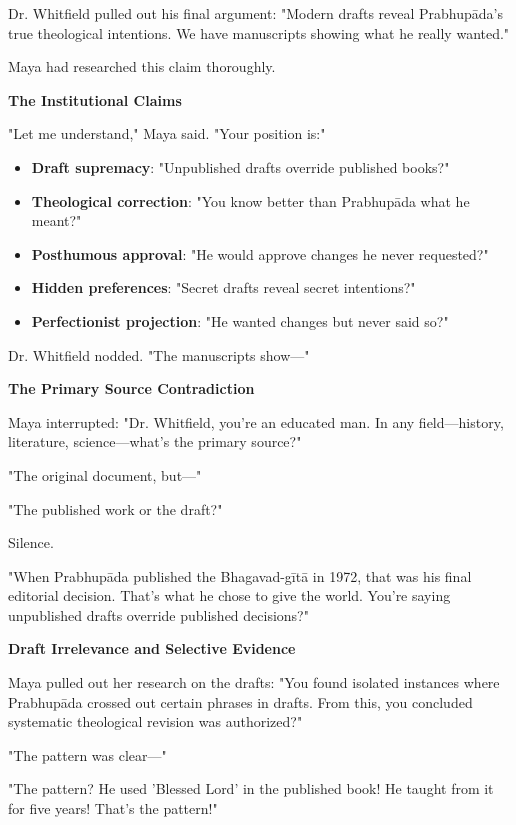\documentclass[11pt,twoside]{book}
\begin{document}
Dr. Whitfield pulled out his final argument: "Modern drafts reveal Prabhupāda's true theological intentions. We have manuscripts showing what he really wanted."

Maya had researched this claim thoroughly.

\textbf{\textbf{The Institutional Claims}}

"Let me understand," Maya said. "Your position is:"

\begin{itemize}
\item \textbf{\textbf{Draft supremacy}}: "Unpublished drafts override published books?"
\item \textbf{\textbf{Theological correction}}: "You know better than Prabhupāda what he meant?"
\item \textbf{\textbf{Posthumous approval}}: "He would approve changes he never requested?"
\item \textbf{\textbf{Hidden preferences}}: "Secret drafts reveal secret intentions?"
\item \textbf{\textbf{Perfectionist projection}}: "He wanted changes but never said so?"
\end{itemize}

Dr. Whitfield nodded. "The manuscripts show—"

\textbf{\textbf{The Primary Source Contradiction}}

Maya interrupted: "Dr. Whitfield, you're an educated man. In any field—history, literature, science—what's the primary source?"

"The original document, but—"

"The published work or the draft?"

Silence.

"When Prabhupāda published the Bhagavad-gītā in 1972, that was his final editorial decision. That's what he chose to give the world. You're saying unpublished drafts override published decisions?"

\textbf{\textbf{\textbf{Draft Irrelevance and Selective Evidence}}}

Maya pulled out her research on the drafts: "You found isolated instances where Prabhupāda crossed out certain phrases in drafts. From this, you concluded systematic theological revision was authorized?"

"The pattern was clear—"

"The pattern? He used 'Blessed Lord' in the published book! He taught from it for five years! That's the pattern!"
\end{document}
